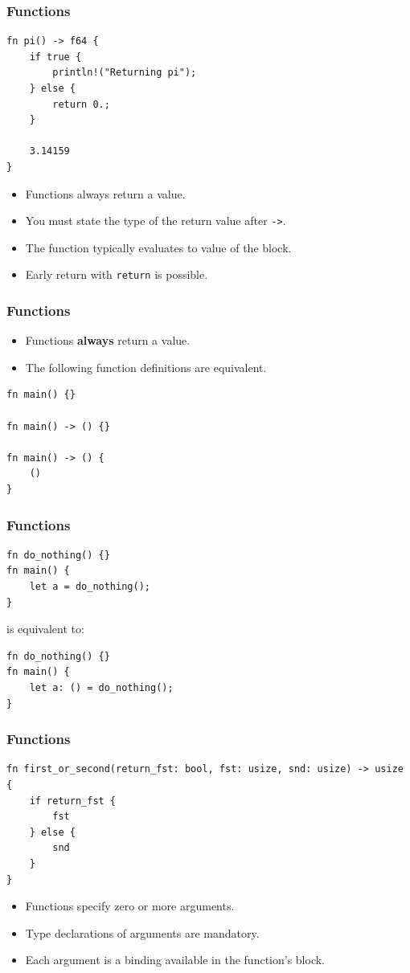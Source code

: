 \documentclass[aspectratio=169]{beamer}
\begin{document}
\begin{frame}[fragile]
    \frametitle{Functions}
    \begin{verbatim}
fn pi() -> f64 {
    if true {
        println!("Returning pi");
    } else {
        return 0.;
    }

    3.14159
}
    \end{verbatim}
    \pause
    \begin{itemize}
        \item Functions always return a value.
        \item You must state the type of the return value after \texttt{->}.
        \pause
        \item The function typically evaluates to value of the block.
        \item Early return with \texttt{return} is possible.
    \end{itemize}
\end{frame}

\begin{frame}[fragile]
    \frametitle{Functions}
    
    \begin{itemize}
        \item Functions \textbf{always} return a value.
        \item The following function definitions are equivalent.
    \end{itemize}
    \pause
    \begin{verbatim}
fn main() {}

fn main() -> () {}

fn main() -> () {
    ()
}
    \end{verbatim}
\end{frame}

\begin{frame}[fragile]
    \frametitle{Functions}
    
    \begin{verbatim}
fn do_nothing() {}
fn main() {
    let a = do_nothing();
}
    \end{verbatim}
    \pause
    is equivalent to:
    \begin{verbatim}
fn do_nothing() {}
fn main() {
    let a: () = do_nothing();
}
    \end{verbatim}
\end{frame}

\begin{frame}[fragile]
    \frametitle{Functions}
    \begin{verbatim}
fn first_or_second(return_fst: bool, fst: usize, snd: usize) -> usize {
    if return_fst {
        fst
    } else {
        snd
    }
}
    \end{verbatim}
    \pause
    \begin{itemize}
        \item Functions specify zero or more arguments.
        \item Type declarations of arguments are mandatory.
        \item Each argument is a binding available in the function's block.
    \end{itemize}
\end{frame}
\end{document}
